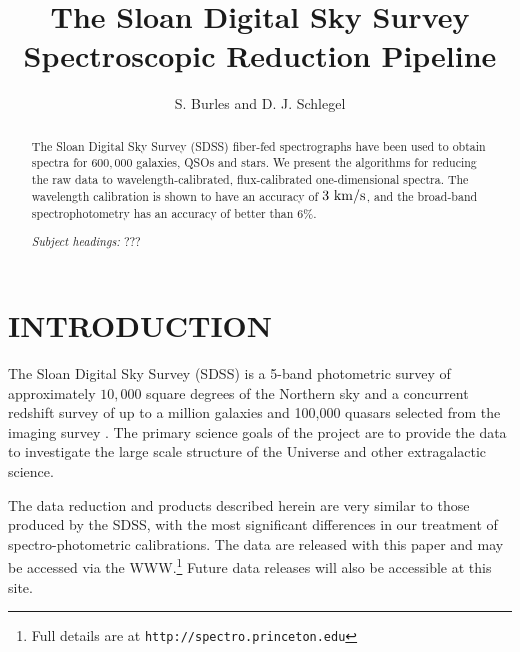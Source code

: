 \documentclass[12pt,preprint]{aastex}
\newcommand{\kms}{{\rm ~km/s}}
\begin{document}
\title{The Sloan Digital Sky Survey Spectroscopic Reduction Pipeline}

\author{
S. Burles\altaffilmark{\ref{MIT}}
and D. J. Schlegel\altaffilmark{\ref{Princeton}}
}


\begin{abstract}
The Sloan Digital Sky Survey (SDSS) fiber-fed spectrographs have been used
to obtain spectra for $600,000$ galaxies, QSOs and stars.
We present the algorithms for reducing the raw data to
wavelength-calibrated, flux-calibrated one-dimensional spectra.
The wavelength calibration is shown to have an accuracy of $3 \kms$,
and the broad-band spectrophotometry has an accuracy of better than $6\%$.

\emph{Subject headings: }
???
\end{abstract}

\section{INTRODUCTION}
\label{sec_intro}
The Sloan Digital Sky Survey (SDSS) is a 5-band photometric survey of
approximately $10,000$ square degrees of the Northern sky and a concurrent
redshift survey of up to a million galaxies and 100,000 quasars
selected from the imaging survey \cite{york00}.  The primary 
science goals of the project are to provide the data to investigate the
large scale structure of the Universe and other extragalactic science.

The data reduction and products described herein are very similar to
those produced by the SDSS, with the most significant differences
in our treatment of spectro-photometric calibrations.
The data are released
with this paper and may be accessed via the WWW.\footnote{Full details
are at \texttt{http://spectro.princeton.edu}}
Future data releases will also be accessible at this site. 
\end{document}
